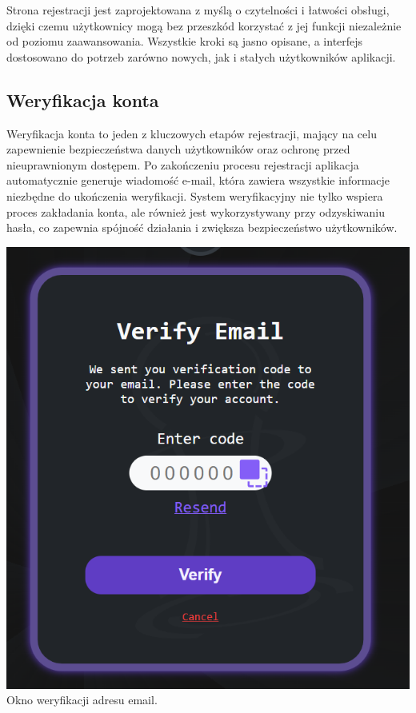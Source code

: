 \documentclass[12pt,a4paper]{article}
\begin{document}
\noindent
Strona rejestracji jest zaprojektowana z myślą o czytelności i łatwości obsługi, dzięki czemu użytkownicy mogą bez przeszkód korzystać z jej funkcji niezależnie od poziomu zaawansowania. Wszystkie kroki są jasno opisane, a interfejs dostosowano do potrzeb zarówno nowych, jak i stałych użytkowników aplikacji.

\newpage

\subsection{Weryfikacja konta}

\begin{minipage}[t]{0.55\textwidth} 
    \vspace{0pt} 
    \raggedright 
    Weryfikacja konta to jeden z kluczowych etapów rejestracji, mający na celu zapewnienie bezpieczeństwa danych użytkowników oraz ochronę przed nieuprawnionym dostępem. Po zakończeniu procesu rejestracji aplikacja automatycznie generuje wiadomość e-mail, która zawiera wszystkie informacje niezbędne do ukończenia weryfikacji. System weryfikacyjny nie tylko wspiera proces zakładania konta, ale również jest wykorzystywany przy odzyskiwaniu hasła, co zapewnia spójność działania i zwiększa bezpieczeństwo użytkowników. 
\end{minipage} 
\hfill 
\begin{minipage}[t]{0.35\textwidth} 
    \vspace{0pt} 
    \centering 
    \includegraphics[width=\linewidth]{images/ins_min_ver.png} 
    Okno weryfikacji adresu email.
\end{minipage}
\end{document}
